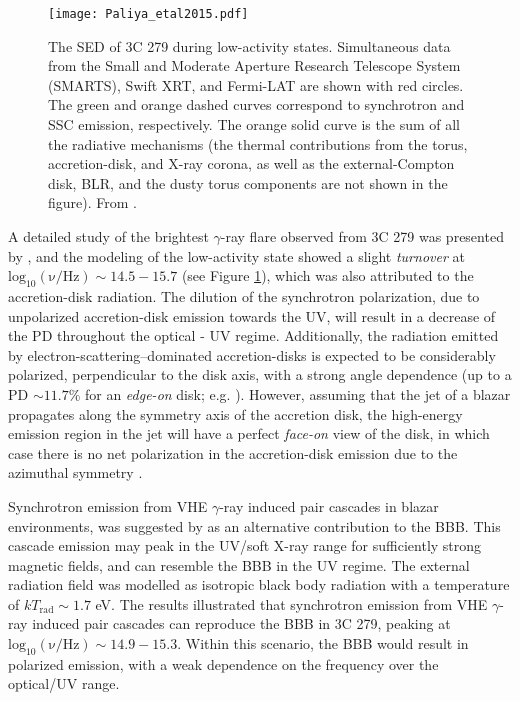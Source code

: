 \documentclass[twocolumn, tighten, twocolappendix]{aastex63}
\begin{document}
\begin{figure}[ht!]
\texttt{[image: Paliya\_etal2015.pdf]}
\caption{The SED of 3C 279 during low-activity states. Simultaneous data from the Small and Moderate Aperture Research Telescope System (SMARTS), Swift XRT, and Fermi-LAT are shown with red circles. The green and orange dashed curves correspond to synchrotron and SSC emission, respectively. The orange solid curve is the sum of all the radiative mechanisms (the thermal contributions from the torus, accretion-disk, and X-ray corona, as well as the external-Compton disk, BLR, and the dusty torus components are not shown in the figure). From \cite{Paliya_etal2015}. \label{fig:Paliya_etal2015}}
\end{figure}
A detailed study of the brightest $\gamma$-ray flare observed from 3C 279 was presented by \cite{Paliya_etal2015}, and the modeling of the low-activity state showed a slight \textit{turnover} at $\mathrm{log_{10}(\nu/ Hz)}\sim 14.5 - 15.7$ (see Figure \ref{fig:Paliya_etal2015}), which was also attributed to the accretion-disk radiation. The dilution of the synchrotron polarization, due to unpolarized accretion-disk emission towards the UV, will result in a decrease of the PD throughout the optical - UV regime. Additionally, the radiation emitted by electron-scattering–dominated accretion-disks is expected to be considerably polarized, perpendicular to the disk axis, with a strong angle dependence (up to a PD $\sim 11.7\%$ for an \textit{edge-on} disk; e.g. \cite{Chandrasekhar_1960}). However, assuming that the jet of a blazar propagates along the symmetry axis of the accretion disk, the high-energy emission region in the jet will have a perfect \textit{face-on} view of the disk, in which case there is no net polarization in the accretion-disk emission due to the azimuthal symmetry \citep{Smith_etal2004}.

Synchrotron emission from VHE $\gamma$-ray induced pair cascades in blazar environments, was suggested by \cite{Roustazadeh_Botther_2012} as an alternative contribution to the BBB. This cascade emission may peak in the UV/soft X-ray range for sufficiently strong magnetic fields, and can resemble the BBB in the UV regime. The external radiation field was modelled as isotropic black body radiation with a temperature of $kT_{\mathrm{rad}} \sim 1.7$ eV. The results illustrated that synchrotron emission from VHE $\gamma$-ray induced pair cascades can reproduce the BBB in 3C 279, peaking at $\mathrm{log_{10}(\nu/ Hz)}\sim 14.9-15.3$. Within this scenario, the BBB would result in polarized emission, with a weak dependence on the frequency over the optical/UV range.
\newpage
\end{document}
